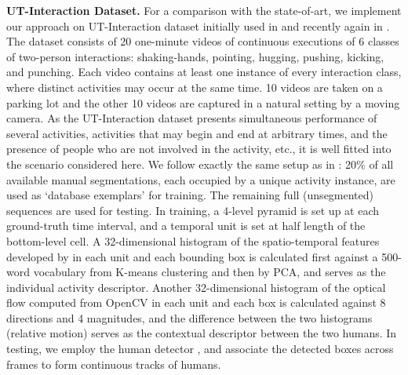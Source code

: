 \documentclass[10pt,twocolumn,letterpaper]{article}
\begin{document}
\vspace{0.05in}

\noindent\textbf{UT-Interaction Dataset.} For a comparison with the state-of-art, we implement our approach on UT-Interaction dataset initially used in \cite{Ryoo:group} and recently again in \cite{Amer:group}. The dataset consists of 20 one-minute videos of continuous executions of 6 classes of two-person interactions: shaking-hands, pointing, hugging, pushing, kicking, and punching. Each video contains at least one instance of every interaction class, where distinct activities may occur at the same time. 10 videos are taken on a parking lot and the other 10 videos are captured in a natural setting by a moving camera. As the UT-Interaction dataset presents simultaneous performance of several activities, activities that may begin and end at arbitrary times, and the presence of people who are not involved in the activity, etc., it is well fitted into the scenario considered here. We follow exactly the same setup as in \cite{Ryoo:group,Amer:group}: 20\% of all available manual segmentations, each occupied by a unique activity instance, are used as `database exemplars' for training. The remaining full (unsegmented) sequences are used for testing. In training, a 4-level pyramid is set up at each ground-truth time interval, and a temporal unit is set at half length of the bottom-level cell. A 32-dimensional histogram of the spatio-temporal features developed by \cite{Dollar:STIP} in each unit and each bounding box is calculated first against a 500-word vocabulary from K-means clustering and then by PCA, and serves as the individual activity descriptor. Another 32-dimensional histogram of the optical flow computed from OpenCV in each unit and each box is calculated against 8 directions and 4 magnitudes, and the difference between the two histograms (relative motion) serves as the contextual descriptor between the two humans. In testing, we employ the human detector \cite{Pedro:detect}, and associate the detected boxes across frames to form continuous tracks of humans. 
\end{document}
